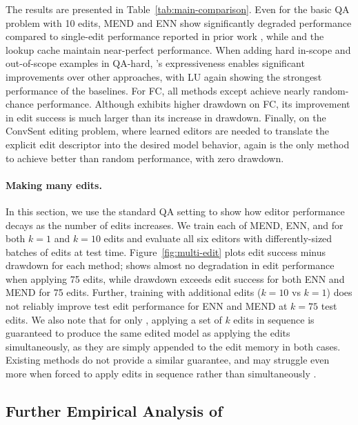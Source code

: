 \documentclass{article}
\begin{document}
The results are presented in Table~\ref{tab:main-comparison}.
Even for the basic QA problem with 10 edits, MEND and ENN show significantly degraded performance compared to single-edit performance reported in prior work \citep{mitchell2021fast}, while {\name} and the lookup cache maintain near-perfect performance. When adding hard in-scope and out-of-scope examples in QA-hard, {\name}'s expressiveness enables significant improvements over other approaches, with LU again showing the strongest performance of the baselines. For FC, all methods except {\name} achieve nearly random-chance performance. Although {\name} exhibits higher drawdown on FC, its improvement in edit success is much larger than its increase in drawdown. Finally, on the ConvSent editing problem, where learned editors are needed to translate the explicit edit descriptor into the desired model behavior, {\name} again is the only method to achieve better than random performance, with zero drawdown.



\paragraph{Making many edits.}
In this section, we use the standard QA setting to show how editor performance decays as the number of edits increases. We train each of MEND, ENN, and {\name} for both $k=1$ and $k=10$ edits and evaluate all six editors with differently-sized batches of edits at test time. Figure~\ref{fig:multi-edit} plots edit success minus drawdown for each method; {\name} shows almost no degradation in edit performance when applying 75 edits, while drawdown exceeds edit success for both ENN and MEND for 75 edits. Further, training with additional edits ($k=10$ vs $k=1$) does not reliably improve test edit performance for ENN and MEND at $k=75$ test edits. We also note that for only {\name}, applying a set of $k$ edits in sequence is guaranteed to produce the same edited model as applying the edits simultaneously, as they are simply appended to the edit memory in both cases. Existing methods do not provide a similar guarantee, and may struggle even more when forced to apply edits in sequence rather than simultaneously \citet{hase2021language}.

\subsection{Further Empirical Analysis of {\name}}
\end{document}
